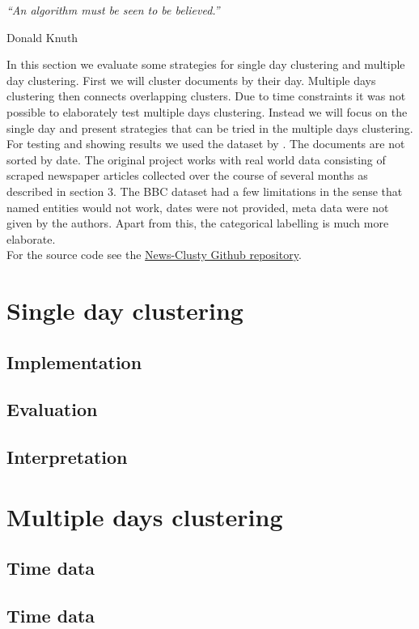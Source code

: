 \epigraph{\emph{
  ``An algorithm must be seen to be believed.''
}}{ Donald Knuth }

In this section we evaluate some strategies for single day clustering and multiple day clustering. First we will cluster documents by their day. Multiple days clustering then connects overlapping clusters. Due to time constraints it was not possible to elaborately test multiple days clustering. Instead we will focus on the single day and present strategies that can be tried in the multiple days clustering.\\
For testing and showing results we used the dataset by \cite{BBCData2006}. The documents are not sorted by date. The original project works with real world data consisting of scraped newspaper articles collected over the course of several months as described in section 3. The BBC dataset had a few limitations in the sense that named entities would not work, dates were not provided, meta data were not given by the authors. Apart from this, the categorical labelling is much more elaborate.\\
For the source code see the \href{https://github.com/sacry-/text-mining-haw-bachelor/}{News-Clusty Github repository}.

\section{Single day clustering}
  \subsection{Implementation}
  \subsection{Evaluation}
  \subsection{Interpretation}

\section{Multiple days clustering}
  \subsection{Time data}
  \subsection{Time data}